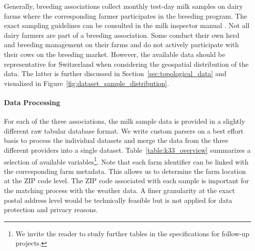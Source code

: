 Generally, breeding associations collect monthly test-day milk samples on dairy farms where the corresponding farmer participates in the breeding program. The exact sampling guidelines can be consulted in the milk inspector manual \citep{swissherdbook_2019}. Not all dairy farmers are part of a breeding association. Some conduct their own herd and breeding management on their farms and do not actively participate with their cows on the breeding market. However, the available data should be representative for Switzerland when considering the geospatial distribution of the data. The latter is further discussed in Section~\ref{sec:topological_data} and visualized in Figure~\ref{fig:dataset_sample_distribution}.

\paragraph{Data Processing}
For each of the three associations, the milk sample data is provided in a slightly different raw tabular database format. We write custom parsers on a best effort basis to process the individual datasets and merge the data from the three different providers into a single dataset. Table~\ref{table:k33_overview} summarizes a selection of available variables\footnote{We invite the reader to study further tables in the \cite{asr2024} specifications for follow-up projects.}. Note that each farm identifier can be linked with the corresponding farm metadata. This allows us to determine the farm location at the ZIP code level. The ZIP code associated with each sample is important for the matching process with the weather data. A finer granularity at the exact postal address level would be technically feasible but is not applied for data protection and privacy reasons.


